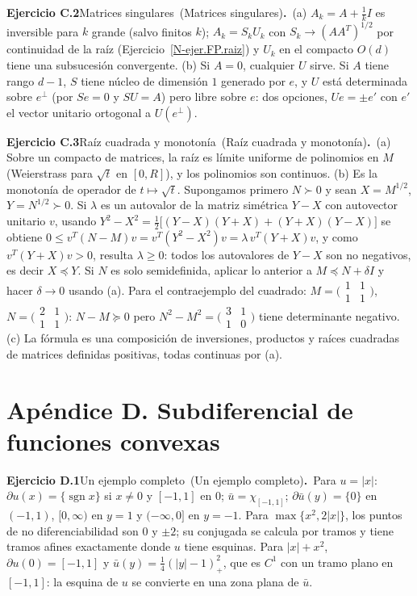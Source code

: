 \documentclass[11pt,a4paper]{amsart}
\theoremstyle{remark}
\theoremstyle{definition}
\numberwithin{subsection}{section}
\numberwithin{equation}{section}
\newcommand{\ejlabel}[2]{\par\medskip\noindent\textbf{Ejercicio #1}\ifx\relax#2\relax\else\ (#2)\fi\textbf{.}\ }
\begin{document}
\ejlabel{C.2}{Matrices singulares}(a) $A_k=A+\frac1kI$ es inversible para $k$ grande (salvo finitos $k$); $A_k=S_kU_k$ con $S_k\to(AA^T)^{1/2}$ por continuidad de la raíz (Ejercicio~\ref{N-ejer.FP.raiz}) y $U_k$ en el compacto $O(d)$ tiene una subsucesión convergente. (b) Si $A=0$, cualquier $U$ sirve. Si $A$ tiene rango $d-1$, $S$ tiene núcleo de dimensión $1$ generado por $e$, y $U$ está determinada sobre $e^\perp$ (por $Se=0$ y $SU=A$) pero libre sobre $e$: dos opciones, $Ue=\pm e'$ con $e'$ el vector unitario ortogonal a $U(e^\perp)$.

\ejlabel{C.3}{Raíz cuadrada y monotonía}(a) Sobre un compacto de matrices, la raíz es límite uniforme de polinomios en $M$ (Weierstrass para $\sqrt t$ en $[0,R]$), y los polinomios son continuos. (b) Es la monotonía de operador de $t\mapsto\sqrt t$. Supongamos primero $N\succ0$ y sean $X=M^{1/2}$, $Y=N^{1/2}\succ0$. Si $\lambda$ es un autovalor de la matriz simétrica $Y-X$ con autovector unitario $v$, usando $Y^2-X^2=\frac12\bigl[(Y-X)(Y+X)+(Y+X)(Y-X)\bigr]$ se obtiene $0\le v^T(N-M)v=v^T(Y^2-X^2)v=\lambda\,v^T(Y+X)v$, y como $v^T(Y+X)v>0$, resulta $\lambda\ge0$: todos los autovalores de $Y-X$ son no negativos, es decir $X\preceq Y$. Si $N$ es solo semidefinida, aplicar lo anterior a $M\preceq N+\delta I$ y hacer $\delta\to0$ usando (a). Para el contraejemplo del cuadrado: $M=\bigl(\begin{smallmatrix}1&1\\1&1\end{smallmatrix}\bigr)$, $N=\bigl(\begin{smallmatrix}2&1\\1&1\end{smallmatrix}\bigr)$: $N-M\succeq0$ pero $N^2-M^2=\bigl(\begin{smallmatrix}3&1\\1&0\end{smallmatrix}\bigr)$ tiene determinante negativo. (c) La fórmula es una composición de inversiones, productos y raíces cuadradas de matrices definidas positivas, todas continuas por (a).

\section*{Apéndice D. Subdiferencial de funciones convexas}
\ejlabel{D.1}{Un ejemplo completo}Para $u=|x|$: $\partial u(x)=\{\operatorname{sgn}x\}$ si $x\ne0$ y $[-1,1]$ en $0$; $\bar u=\chi_{[-1,1]}$; $\partial\bar u(y)=\{0\}$ en $(-1,1)$, $[0,\infty)$ en $y=1$ y $(-\infty,0]$ en $y=-1$. Para $\max\{x^2,2|x|\}$, los puntos de no diferenciabilidad son $0$ y $\pm2$; su conjugada se calcula por tramos y tiene tramos afines exactamente donde $u$ tiene esquinas. Para $|x|+x^2$, $\partial u(0)=[-1,1]$ y $\bar u(y)=\frac14(|y|-1)_+^2$, que es $C^1$ con un tramo plano en $[-1,1]$: la esquina de $u$ se convierte en una zona plana de $\bar u$.
\end{document}
